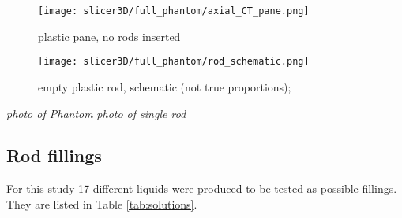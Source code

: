 
\begin{figure}[!tbp]
\centering
\texttt{[image: slicer3D/full\_phantom/axial\_CT\_pane.png]}
\caption{plastic pane, no rods inserted}
\label{fig:axial_CT_pane}
\end{figure}

\begin{figure}[!tbp]
\centering
\texttt{[image: slicer3D/full\_phantom/rod\_schematic.png]}
\caption{empty plastic rod, schematic (not true proportions); }
\label{fig:rod_schematic}
\end{figure}

\vspace{4cm}
\textit{photo of Phantom}
\vspace{2cm}
\vspace{4cm}
\textit{photo of single rod}
\vspace{2cm}

\subsection{Rod fillings}

For this study 17 different liquids were produced to be tested as possible fillings.
They are listed in Table \ref{tab:solutions}.


